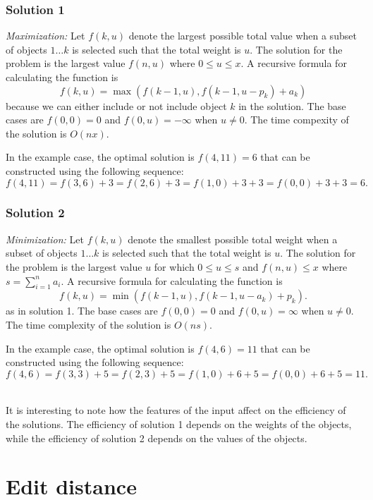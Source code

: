 \subsubsection{Solution 1}

\textit{Maximization:} Let $f(k,u)$
denote the largest possible total value
when a subset of objects $1 \ldots k$ is selected
such that the total weight is $u$.
The solution for the problem is
the largest value
$f(n,u)$ where $0 \le u \le x$.
A recursive formula for calculating
the function is
\[f(k,u) = \max(f(k-1,u),f(k-1,u-p_k)+a_k)\]
because we can either include or not include
object $k$ in the solution.
The base cases are $f(0,0)=0$ and $f(0,u)=-\infty$
when $u \neq 0$. The time compexity of
the solution is $O(nx)$.

In the example case, the optimal solution is
$f(4,11)=6$ that can be constructed
using the following sequence:
\[f(4,11)=f(3,6)+3=f(2,6)+3=f(1,0)+3+3=f(0,0)+3+3=6.\]

\subsubsection{Solution 2}

\textit{Minimization:} Let $f(k,u)$
denote the smallest possible total weight
when a subset of objects
$1 \ldots k$ is selected such
that the total weight is $u$.
The solution for the problem is the
largest value $u$
for which  $0 \le u \le s$ and $f(n,u) \le x$
where $s=\sum_{i=1}^n a_i$.
A recursive formula for calculating the function is
\[f(k,u) = \min(f(k-1,u),f(k-1,u-a_k)+p_k).\]
as in solution 1.
The base cases are $f(0,0)=0$ and $f(0,u)=\infty$
when $u \neq 0$.
The time complexity of the solution is $O(ns)$.

In the example case, the optimal solution is $f(4,6)=11$
that can be constructed using the following sequence:
\[f(4,6)=f(3,3)+5=f(2,3)+5=f(1,0)+6+5=f(0,0)+6+5=11.\]

~\\
It is interesting to note how the features of the input
affect on the efficiency of the solutions.
The efficiency of solution 1 depends on the weights
of the objects, while the efficiency of solution 2
depends on the values of the objects.

\section{Edit distance}


